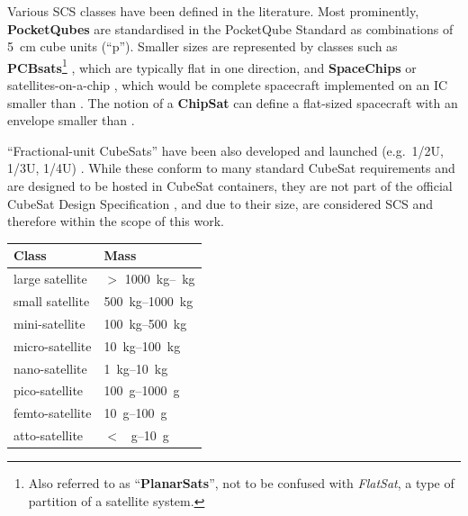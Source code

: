 \documentclass[a4paper,nobib,justified,final]{tufte-book}
\begin{document}
Various \acl{SCS} classes have been defined in the literature. Most prominently, \textbf{PocketQubes} are standardised in the PocketQube Standard \autocite{raduDelfiPQFirstPocketqube2018} as combinations of \SI{5}{\centi\meter} cube units (``p''). Smaller sizes are represented by classes such as \textbf{\acs{PCB}sats}\footnote{Also referred to as ``\textbf{PlanarSats}'', not to be confused with \emph{FlatSat}, a type of partition of a satellite system.} \autocite{barnhartLowcostFemtosatelliteEnable2009}, which are typically flat in one direction, and \textbf{SpaceChips} or satellites-on-a-chip \autocite{barnhartSatelliteonaChipFeasibilityStudy2006}, which would be complete spacecraft implemented on an \acf{IC} smaller than . The notion of a \textbf{ChipSat} can define a flat-sized spacecraft with an envelope smaller than  \autocite{manchesterCentimeterScaleSpacecraftDesign2015}.

``Fractional-unit CubeSats'' have been also developed and launched (e.g.~1/2U, 1/3U, 1/4U) \autocite{kuluNanosatsDatabase2023}. While these conform to many standard CubeSat requirements and are designed to be hosted in CubeSat containers, they are not part of the official CubeSat Design Specification \cite{CDS14}, and due to their size, are considered \acl{SCS} and therefore within the scope of this work.

\begin{margintable}
	\caption[Spacecraft mass classes as defined in this work]{Spacecraft mass classes as defined in this work \autocite{sweetingModernSmallSatellitesChanging2018,heinAttoSatsChipSatsOther2019}}
	\label{tab:satellite_sizes}

	\begin{tabular}{@{}ll@{}}
		\toprule
		Class & Mass \\ \midrule
		large satellite & \( > \) \qtyrange{1000}{}{\kilo\gram} \\
		small satellite & \qtyrange{500}{1000}{\kg} \\
		mini-satellite & \qtyrange{100}{500}{\kg} \\
		micro-satellite & \qtyrange{10}{100}{\kg} \\
		nano-satellite & \qtyrange{1}{10}{\kg} \\
		pico-satellite & \qtyrange{100}{1000}{\gram} \\
		femto-satellite & \qtyrange{10}{100}{\gram} \\
		atto-satellite & \(<\) \qtyrange{}{10}{\gram} \\ \bottomrule
	\end{tabular}
\end{margintable}
\end{document}
